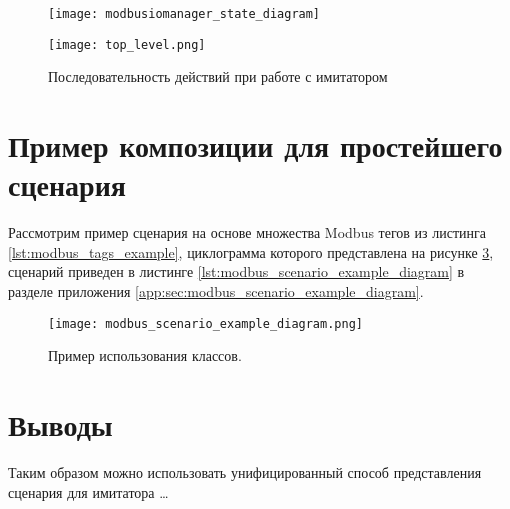 \begin{center}
    \begin{figure}
        \texttt{[image: modbusiomanager\_state\_diagram]}
        \caption{}\label{fig:modbusiomanager_state_diagram}
    \end{figure}
\end{center}

\begin{center}
    \begin{figure}
        \texttt{[image: top\_level.png]}
        \caption{Последовательность действий при работе с имитатором}\label{fig:top_level_sequence}
    \end{figure}
\end{center}

\clearpage
\section{Пример композиции для простейшего сценария}

Рассмотрим пример сценария на основе множества Modbus тегов из листинга \ref{lst:modbus_tags_example},
циклограмма которого представлена на рисунке \ref{fig:modbus_scenario_example_diagram},
сценарий приведен в листинге \ref{lst:modbus_scenario_example_diagram} в разделе приложения \ref{app:sec:modbus_scenario_example_diagram}.

\begin{landscape}
    \begin{center}
        \begin{figure}
            \texttt{[image: modbus\_scenario\_example\_diagram.png]}
            \caption{Пример использования классов.}\label{fig:modbus_scenario_example_diagram}
        \end{figure}
    \end{center}
\end{landscape}


\section*{Выводы}
Таким образом можно использовать унифицированный способ представления сценария для имитатора \ldots



